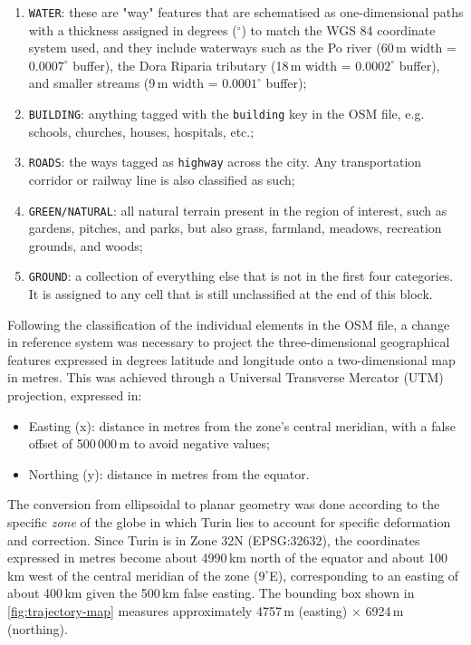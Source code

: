 \begin{enumerate}
  \item \texttt{WATER}: these are "way" features that are schematised as one-dimensional paths with a thickness assigned in degrees ($^\circ$) to match the WGS 84 coordinate system used, and they include waterways such as the Po river (60\,m width = $0.0007^\circ$ buffer), the Dora Riparia tributary (18\,m width = $0.0002^\circ$ buffer), and smaller streams (9\,m width = $0.0001^\circ$ buffer);
  \item \texttt{BUILDING}: anything tagged with the \texttt{building} key in the OSM file, e.g. schools, churches, houses, hospitals, etc.;
  \item \texttt{ROADS}: the ways tagged as \texttt{highway} across the city. Any transportation corridor or railway line is also classified as such;
  \item \texttt{GREEN/NATURAL}: all natural terrain present in the region of interest, such as gardens, pitches, and parks, but also grass, farmland, meadows, recreation grounds, and woods;
  \item \texttt{GROUND}: a collection of everything else that is not in the first four categories. It is assigned to any cell that is still unclassified at the end of this block.
\end{enumerate}

Following the classification of the individual elements in the OSM file, a change in reference system was necessary to project the three-dimensional geographical features expressed in degrees latitude and longitude onto a two-dimensional map in metres. This was achieved through a Universal Transverse Mercator (UTM) projection, expressed in:

\begin{itemize}
  \item Easting (x): distance in metres from the zone's central meridian, with a false offset of 500\,000\,m to avoid negative values;
  \item Northing (y): distance in metres from the equator.
\end{itemize}

The conversion from ellipsoidal to planar geometry was done according to the specific \textit{zone} of the globe in which Turin lies to account for specific deformation and correction. Since Turin is in Zone 32N (EPSG:32632), the coordinates expressed in metres become about 4990\,km north of the equator and about 100\,km west of the central meridian of the zone ($9^\circ$E), corresponding to an easting of about 400\,km given the 500\,km false easting. The bounding box shown in \cref{fig:trajectory-map} measures approximately 4757\,m (easting) $\times$ 6924\,m (northing).

